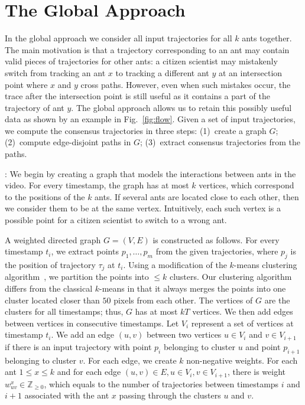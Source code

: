 \documentclass{llncs}
\begin{document}
\section{The Global Approach}
\label{sect:global}

In the global approach we consider all input trajectories for all $k$
ants together. The main motivation is that a trajectory corresponding
to an ant may contain valid pieces of trajectories for other ants:
a citizen scientist may mistakenly switch from tracking
an ant $x$ to tracking a different ant $y$ at an intersection point where
$x$ and $y$ cross paths. However, even when such mistakes occur, the
trace after the intersection point is still useful as it contains a
part of the trajectory of ant $y$. The global approach allows us to
retain this possibly useful data as shown by an example in
Fig.~\ref{fig:flow}.
Given a set of input trajectories, we compute the consensus
trajectories in three steps: (1)~create a graph $G$; (2)~compute edge-disjoint
paths in $G$; (3)~extract consensus trajectories from the paths.

: We begin by creating a graph that
models the interactions between ants in the video. For every timestamp,
the graph has at most $k$ vertices, which correspond to the
positions of the $k$ ants. If several ants are located close to each
other, then
we consider them to be at the same vertex. Intuitively, each such vertex is
a possible point for a citizen scientist to switch to a wrong ant.

A weighted directed graph $G=(V,E)$ is constructed as follows. For
every timestamp $t_i$, we extract points $p_1,\dots,p_m$ from the
given trajectories, where $p_j$ is the position of trajectory $\tau_j$
at $t_i$. Using a modification of the $k$-means clustering algorithm~\cite{lloyd82}, we
partition the points into $\le k$ clusters.
Our clustering algorithm
differs from the classical $k$-means in that it always merges the points
into one cluster located closer than $50$ pixels from each other.
The vertices of $G$ are the clusters for all
timestamps; thus, $G$ has at most $kT$ vertices. We then add edges
between vertices in consecutive timestamps. Let $V_i$ represent a set
of vertices at timestamp $t_i$. We add an edge $(u,v)$ between two
vertices $u\in V_i$ and $v\in V_{i+1}$ if there is an input trajectory
with point $p_i$ belonging to cluster $u$ and point $p_{i+1}$
belonging to cluster $v$. For each edge, we create $k$
non-negative weights. For each ant $1\le x \le k$ and for each edge
$(u,v) \in E, u \in V_i, v \in V_{i+1}$, there is weight $w_{uv}^x\in
\mathbb{Z}_{\ge0}$, which equals to the number of trajectories between timestamps
$i$ and $i+1$ associated
with the ant $x$ passing through the clusters $u$ and $v$.
\end{document}
